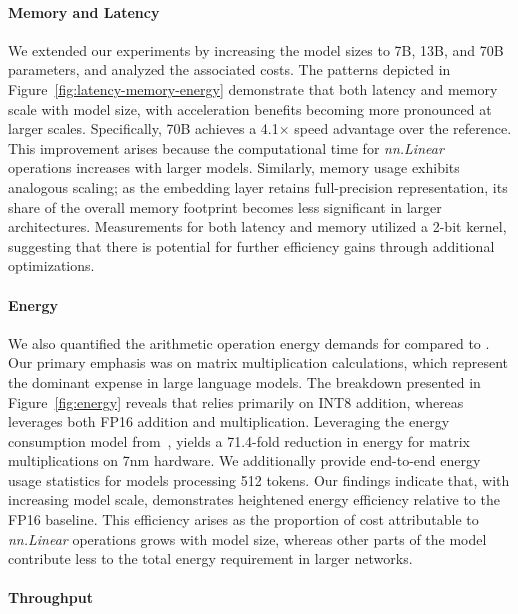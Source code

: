 \paragraph{Memory and Latency}

We extended our experiments by increasing the model sizes to 7B, 13B, and 70B parameters, and analyzed the associated costs. The patterns depicted in Figure~\ref{fig:latency-memory-energy} demonstrate that both latency and memory scale with model size, with acceleration benefits becoming more pronounced at larger scales. Specifically,  70B achieves a 4.1$\times$ speed advantage over the  reference. This improvement arises because the computational time for \emph{nn.Linear} operations increases with larger models. Similarly, memory usage exhibits analogous scaling; as the embedding layer retains full-precision representation, its share of the overall memory footprint becomes less significant in larger architectures. Measurements for both latency and memory utilized a 2-bit kernel, suggesting that there is potential for further efficiency gains through additional optimizations.

\paragraph{Energy}

We also quantified the arithmetic operation energy demands for  compared to . Our primary emphasis was on matrix multiplication calculations, which represent the dominant expense in large language models. The breakdown presented in Figure~\ref{fig:energy} reveals that  relies primarily on INT8 addition, whereas  leverages both FP16 addition and multiplication. Leveraging the energy consumption model from~\cite{energycost, pokebnn},  yields a 71.4-fold reduction in energy for matrix multiplications on 7nm hardware. We additionally provide end-to-end energy usage statistics for models processing 512 tokens. Our findings indicate that, with increasing model scale,  demonstrates heightened energy efficiency relative to the FP16  baseline. This efficiency arises as the proportion of cost attributable to \emph{nn.Linear} operations grows with model size, whereas other parts of the model contribute less to the total energy requirement in larger networks.

\paragraph{Throughput}

